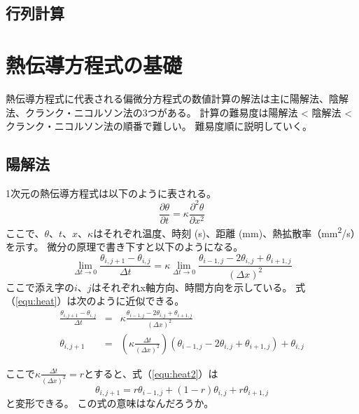\documentclass[]{ltjsbook}
\begin{document}
	\section{行列計算}
	
	
	\chapter{熱伝導方程式の基礎}
	熱伝導方程式に代表される偏微分方程式の数値計算の解法は主に陽解法、陰解法、クランク・ニコルソン法の3つがある。
	計算の難易度は陽解法 < 陰解法 < クランク・ニコルソン法の順番で難しい。
	難易度順に説明していく。
	\section{陽解法}
	1次元の熱伝導方程式は以下のように表される。
	\begin{equation}
		\frac{\partial \theta}{\partial t} = \kappa \frac{\partial^2 \theta}{\partial x ^2}
	\end{equation}
	ここで、$\theta$、$t$、$x$、$\kappa$はそれぞれ温度、時刻 (s)、距離 (mm)、熱拡散率（mm\textsuperscript{2}/s）を示す。
	微分の原理で書き下すと以下のようになる。
	\begin{equation}
		\displaystyle{\lim_{\Delta t \to 0} \frac{\theta_{i, j+1} - \theta_{i , j}}{\Delta t}} = \kappa \displaystyle{\lim_{\Delta t \to 0}\frac{\theta_{i-1, j} - 2 \theta_{i, j} + \theta_{i+1, j}}{(\Delta x)^2}}
		\label{equ:heat}
	\end{equation}
	ここで添え字の$i$、$j$はそれぞれx軸方向、時間方向を示している。
	式（\ref{equ:heat}）は次のように近似できる。
	\begin{eqnarray}
		\frac{\theta_{i, j+1} - \theta_{i , j}}{\Delta t} &=& \kappa \frac{\theta_{i-1, j} - 2 \theta_{i, j} + \theta_{i+1, j}}{(\Delta x)^2} \\
		\theta_{i, j+1} &=& \left(\kappa \frac{\Delta t}{(\Delta x)^2}\right) (\theta_{i-1, j} -2\theta_{i, j} + \theta_{i+1, j}) + \theta_{i, j}
		\label{equ:heat2}
	\end{eqnarray}
	
	ここで$\displaystyle{\kappa \frac{\Delta t}{(\Delta x)^2} = r}$とすると、式（\ref{equ:heat2}）は
	\begin{equation}
		\theta_{i, j+1} = r\theta_{i-1, j} + (1-r)\theta_{i, j} + r\theta_{i+1, j}
		\label{equ:heat3}
	\end{equation}
	と変形できる。
	この式の意味はなんだろうか。
	
\end{document}
